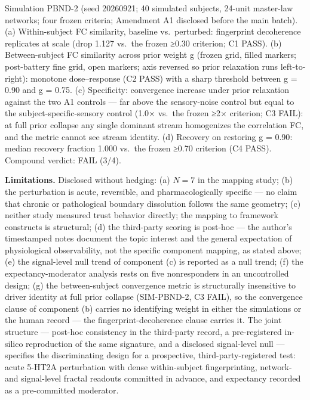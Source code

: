 \documentclass[
]{article}
\begin{document}
Simulation PBND-2 (seed 20260921; 40 simulated subjects, 24-unit
master-law networks; four frozen criteria; Amendment A1 disclosed before
the main batch). (a) Within-subject FC similarity, baseline
vs.~perturbed: fingerprint decoherence replicates at scale (drop 1.127
vs.~the frozen {≥}0.30 criterion; C1 PASS). (b) Between-subject FC
similarity across prior weight {g} (frozen grid, filled markers;
post-battery fine grid, open markers; axis reversed so prior relaxation
runs left-to-right): monotone dose--response (C2 PASS) with a sharp
threshold between {g = 0.90} and {g = 0.75}. (c) Specificity:
convergence increase under prior relaxation against the two A1 controls
--- far above the sensory-noise control but equal to the
subject-specific-sensory control (1.0{×} vs.~the frozen {≥}2{×}
criterion; C3 FAIL): at full prior collapse any single dominant stream
homogenizes the correlation FC, and the metric cannot see stream
identity. (d) Recovery on restoring {g = 0.90}: median recovery fraction
1.000 vs.~the frozen {≥}0.70 criterion (C4 PASS). Compound verdict: FAIL
(3/4).

\textbf{Limitations.} Disclosed without hedging: (a) \(N = 7\) in the
mapping study; (b) the perturbation is acute, reversible, and
pharmacologically specific --- no claim that chronic or pathological
boundary dissolution follows the same geometry; (c) neither study
measured trust behavior directly; the mapping to framework constructs is
structural; (d) the third-party scoring is post-hoc --- the author's
timestamped notes document the topic interest and the general
expectation of physiological observability, not the specific component
mapping, as stated above; (e) the signal-level null trend of component
(c) is reported as a null trend; (f) the expectancy-moderator analysis
rests on five nonresponders in an uncontrolled design; (g) the
between-subject convergence metric is structurally insensitive to driver
identity at full prior collapse (SIM-PBND-2, C3 FAIL), so the
convergence clause of component (b) carries no identifying weight in
either the simulations or the human record --- the
fingerprint-decoherence clause carries it. The joint structure ---
post-hoc consistency in the third-party record, a pre-registered
in-silico reproduction of the same signature, and a disclosed
signal-level null --- specifies the discriminating design for a
prospective, third-party-registered test: acute 5-HT2A perturbation with
dense within-subject fingerprinting, network- and signal-level fractal
readouts committed in advance, and expectancy recorded as a
pre-committed moderator.
\end{document}
